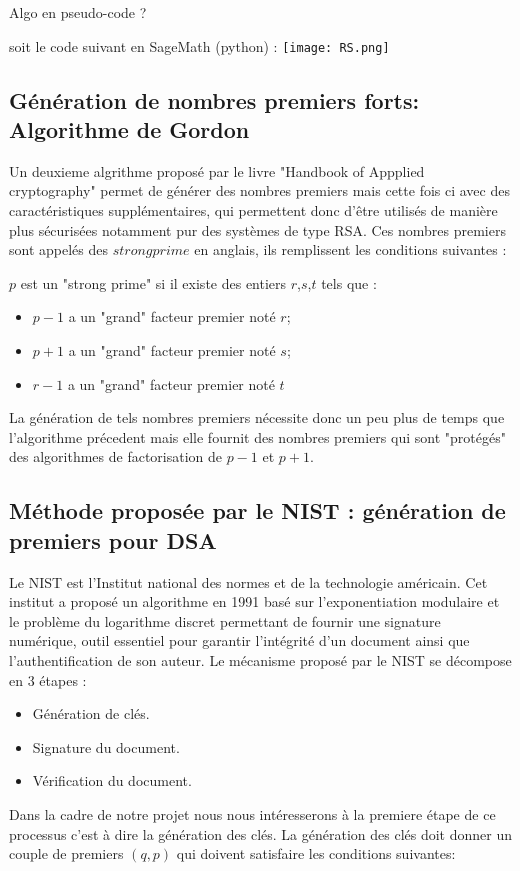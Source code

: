 \documentclass[a4paper,11pt]{article}
\begin{document}
Algo en pseudo-code ?

soit le code suivant en SageMath (python) :
\newline
\texttt{[image: RS.png]}

\subsection{Génération de nombres premiers forts: Algorithme de Gordon}

Un deuxieme algrithme proposé par le livre "Handbook of Appplied cryptography" permet de générer des nombres premiers mais cette fois ci avec des caractéristiques supplémentaires, qui permettent donc d'être utilisés de manière plus sécurisées notamment pur des systèmes de type RSA.
Ces nombres premiers sont appelés des $strong prime$ en anglais, ils remplissent les conditions suivantes : \newline

$p$ est un "strong prime" si il existe des entiers $r$,$s$,$t$ tels que :
\begin{itemize}
\item $p-1$ a un "grand" facteur premier noté $r$;
\item $p+1$ a un "grand" facteur premier noté $s$;
\item $r-1$ a un "grand" facteur premier noté $t$
\end{itemize}
\newline
\medbreak

    La génération de tels nombres premiers nécessite donc un peu plus de temps que l'algorithme précedent mais elle fournit des nombres premiers qui sont "protégés" des algorithmes de factorisation de $p-1$ et $p+1$.

\subsection{Méthode proposée par le NIST :  génération de premiers pour DSA}
Le NIST est l'Institut national des normes et de la technologie américain. Cet institut a proposé un algorithme en 1991 basé sur l'exponentiation modulaire et le problème du logarithme discret permettant de fournir une signature numérique, outil essentiel pour garantir l'intégrité d'un document  ainsi que l'authentification de son auteur.\newline
Le mécanisme proposé par le NIST se décompose en 3 étapes : \newline
\begin{itemize}
\item Génération de clés. 
\item Signature du document.
\item Vérification du document.
\end{itemize}
\medbreak
Dans la cadre de notre projet nous nous intéresserons à la premiere étape de ce processus c'est à dire la génération des clés. 
La génération des clés doit donner un couple de premiers $(q,p)$ qui doivent satisfaire les conditions suivantes:
\end{document}
